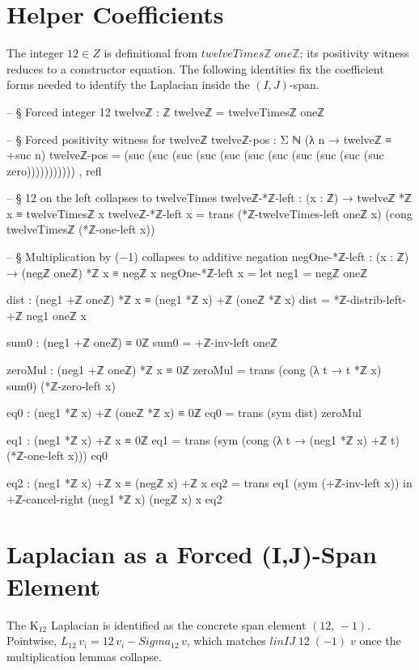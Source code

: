 \documentclass[11pt,a4paper]{book}
\def\Sigma{Sigma}%
\def\mathbb#1{#1}%
\def\texttt#1{#1}%
\def\texorpdfstring#1#2{#2}%
\begin{document}
\section{Helper Coefficients}

The integer $12 \in \mathbb{Z}$ is definitional from
$\texttt{twelveTimesℤ}\;\texttt{oneℤ}$; its positivity witness
reduces to a constructor equation.  The following identities fix the coefficient forms
needed to identify the Laplacian inside the $(I,J)$-span.

\begin{code}
-- § Forced integer 12
twelveℤ : ℤ
twelveℤ = twelveTimesℤ oneℤ

-- § Forced positivity witness for twelveℤ
twelveℤ-pos : Σ ℕ (λ n → twelveℤ ≡ +suc n)
twelveℤ-pos = (suc (suc (suc (suc (suc (suc (suc (suc (suc (suc (suc zero))))))))))) , refl

-- § 12 on the left collapses to twelveTimes
twelveℤ-*ℤ-left : (x : ℤ) → twelveℤ *ℤ x ≡ twelveTimesℤ x
twelveℤ-*ℤ-left x =
  trans
    (*ℤ-twelveTimes-left oneℤ x)
    (cong twelveTimesℤ (*ℤ-one-left x))

-- § Multiplication by (−1) collapses to additive negation
negOne-*ℤ-left : (x : ℤ) → (negℤ oneℤ) *ℤ x ≡ negℤ x
negOne-*ℤ-left x =
  let
    neg1 = negℤ oneℤ

    dist : (neg1 +ℤ oneℤ) *ℤ x ≡ (neg1 *ℤ x) +ℤ (oneℤ *ℤ x)
    dist = *ℤ-distrib-left-+ℤ neg1 oneℤ x

    sum0 : (neg1 +ℤ oneℤ) ≡ 0ℤ
    sum0 = +ℤ-inv-left oneℤ

    zeroMul : (neg1 +ℤ oneℤ) *ℤ x ≡ 0ℤ
    zeroMul = trans (cong (λ t → t *ℤ x) sum0) (*ℤ-zero-left x)

    eq0 : (neg1 *ℤ x) +ℤ (oneℤ *ℤ x) ≡ 0ℤ
    eq0 = trans (sym dist) zeroMul

    eq1 : (neg1 *ℤ x) +ℤ x ≡ 0ℤ
    eq1 = trans (sym (cong (λ t → (neg1 *ℤ x) +ℤ t) (*ℤ-one-left x))) eq0

    eq2 : (neg1 *ℤ x) +ℤ x ≡ (negℤ x) +ℤ x
    eq2 = trans eq1 (sym (+ℤ-inv-left x))
  in
  +ℤ-cancel-right (neg1 *ℤ x) (negℤ x) x eq2
\end{code}


\section{Laplacian as a Forced \texorpdfstring{$(I,J)$}{(I,J)}-Span Element}

The K$_{12}$ Laplacian is identified as the concrete span element
$(12,\,-1)$.
Pointwise, $L_{12}\,v_i = 12\,v_i - \Sigma_{12}\,v$, which
matches $\texttt{linIJ}\;12\;(-1)\;v$ once the multiplication
lemmas collapse.
\end{document}

